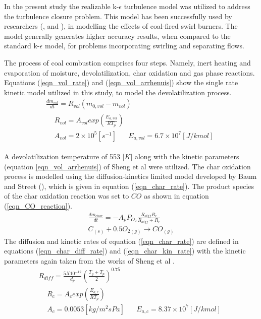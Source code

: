 \documentclass[review]{elsarticle}
\begin{document}
In the present study the realizable k-$\epsilon$ turbulence model was utilized to address the turbulence closure problem. This model has been successfully used by researchers (\cite{Belosevic2019a},\cite{Laubscher2019a} and \cite{Modlinski2019}), in modelling the effects of coal-fired swirl burners. The model generally generates higher accuracy results, when compared to the standard k-$\epsilon$ model, for problems incorporating swirling and separating flows.

The process of coal combustion comprises four steps. Namely, inert heating and evaporation of moisture, devolatilization, char oxidation and gas phase reactions. Equations (\ref{eqn_vol_rate}) and (\ref{eqn_vol_arrhenuis}) show the single rate kinetic model utilized in this study, to model the devolatilization process.
\begin{gather}
\frac{dm_{vol}}{dt} = R_{vol}(m_{0,vol}-m_{vol}) \label{eqn_vol_rate} \\
\begin{split}
&R_{vol} = A_{vol}exp\left(\frac{E_{a,vol}}{RT_p}\right)\\
&A_{vol} = 2\times10^5 [s^{-1}]\,\,\,\,\,\,\,\,\,\,E_{a,vol} = 6.7\times10^7 [J/kmol] \label{eqn_vol_arrhenuis}
\end{split}
\end{gather}

A devolatilization temperature of 553 [$K$] \citep{Ranade2015} along with the kinetic parameters (equation \ref{eqn_vol_arrhenuis}) of Sheng et al \cite{Sheng2004} were utilized. The char oxidation process is modelled using the diffusion-kinetics limited model developed by Baum and Street (\cite{Baum1971}), which is given in equation (\ref{eqn_char_rate}). The product species of the char oxidation reaction was set to $CO$ as shown in equation (\ref{eqn_CO_reaction}). 
\begin{gather}
\frac{dm_{char}}{dt} = -A_p P_{O_{2}} \frac{R_{diff}R_c}{R_{diff} + R_c}  \label{eqn_char_rate}\\
C_{(s)}+0.5O_{2(g)}\to CO_{(g)} \label{eqn_CO_reaction}
\end{gather}
The diffusion and kinetic rates of equation (\ref{eqn_char_rate}) are defined in equations (\ref{eqn_char_diff_rate})  and (\ref{eqn_char_kin_rate}) with the kinetic parameters again taken from the works of Sheng et al \citep{Sheng2004}.
\begin{gather}
R_{diff} = \frac{5X10^{-12}}{d_p} \left(\frac{T_g+T_p}{2}\right)^0.75 \label{eqn_char_diff_rate}\\
\begin{split}
&R_{c} = A_{c}exp\left(\frac{E_{a,c}}{RT_p}\right)\\
&A_{c} = 0.0053 [kg/m^2sPa]\,\,\,\,\,\,\,\,\,\,E_{a,c} = 8.37\times10^7 [J/kmol]
\end{split}
 \label{eqn_char_kin_rate}
\end{gather}
\end{document}
